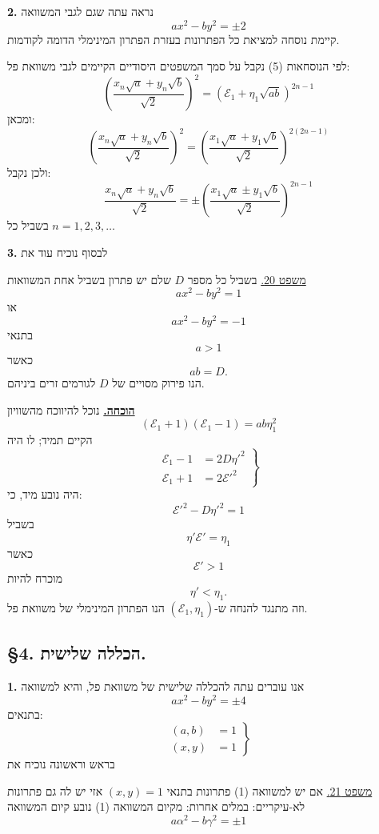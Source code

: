 \bigskip
\noindent\textbf{2.} נראה עתה שגם לגבי המשוואה
\[ ax^2 - by^2 = \pm 2 \]
קיימת נוסחה למציאת כל הפתרונות בעזרת הפתרון המינימלי הדומה לקודמות.

\noindent לפי הנוסחאות (5) נקבל על סמך המשפטים היסודיים הקיימים לגבי משוואת פל:
\[ \left(\frac{x_n\sqrt{a} + y_n\sqrt{b}}{\sqrt{2}}\right)^2 = (\mathcal{E}_1 + \eta_1\sqrt{ab})^{2n-1} \]
ומכאן:
\[ \left(\frac{x_n\sqrt{a} + y_n\sqrt{b}}{\sqrt{2}}\right)^2 = \left(\frac{x_1\sqrt{a} + y_1\sqrt{b}}{\sqrt{2}}\right)^{2(2n-1)} \]
ולכן נקבל:
\[ \boxed{\frac{x_n\sqrt{a} + y_n\sqrt{b}}{\sqrt{2}} = \pm\left(\frac{x_1\sqrt{a} \pm y_1\sqrt{b}}{\sqrt{2}}\right)^{2n-1}} \tag{6} \]
בשביל כל $n = 1, 2, 3, \ldots$

\noindent\textbf{3.} לבסוף נוכיח עוד את

\medskip
\noindent\underline{משפט 20.} בשביל כל מספר $D$ שלם יש פתרון בשביל אחת המשוואות
\[ ax^2 - by^2 = 1 \]
או
\[ ax^2 - by^2 = -1 \]
בתנאי
\[ a>1 \]
כאשר
\[ ab = D. \]
הנו פירוק מסויים של $D$ לגורמים זרים ביניהם.

\medskip
\noindent\textbf{\underline{הוכחה.}}
נוכל להיווכח מהשוויון
\[ (\mathcal{E}_1 + 1)(\mathcal{E}_1 - 1) = ab\eta_1^2 \]
הקיים תמיד; לו היה
\[ \left. \begin{aligned} \mathcal{E}_1 - 1 &= 2D\eta'^2 \\ \mathcal{E}_1 + 1 &= 2\mathcal{E}'^2 \end{aligned} \right\} \]
היה נובע מיד, כי:
\[ \mathcal{E}'^2 - D\eta'^2 = 1 \]
בשביל
\[ \eta'\mathcal{E}' = \eta_1 \]
כאשר
\[ \mathcal{E}' > 1 \]
מוכרח להיות
\[ \eta' < \eta_1 . \]
וזה מתנגד להנחה ש-$(\mathcal{E}_1, \eta_1)$ הנו הפתרון המינימלי של משוואת פל.

\subsection*{\S4. הכללה שלישית.}

\noindent\textbf{1.} אנו עוברים עתה להכללה שלישית של משוואת פל, והיא למשוואה
\[ ax^2 - by^2 = \pm 4 \tag{1} \]
בתנאים:
\[ \left. \begin{aligned} (a,b) &= 1 \\ (x,y) &= 1 \end{aligned} \right\} \tag{2} \]
בראש וראשונה נוכיח את

\medskip
\noindent\underline{משפט 21.} אם יש למשוואה (1) פתרונות בתנאי $(x,y)=1$ אזי יש לה גם פתרונות לא-עיקריים: במלים אחרות: מקיום המשוואה (1) נובע קיום המשוואה
\[ a\alpha^2 - b\gamma^2 = \pm 1 \]

